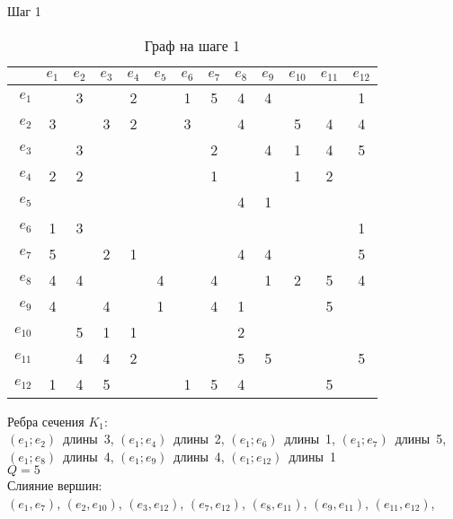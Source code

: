\bigskip
\noindent
\begin{minipage}{\textwidth}
Шаг 1\\
\begin{table}[H]
\centering
\caption{Граф на шаге 1}
\begin{tabular}{r*{12}{|c}}
&$e_{1}$&$e_{2}$&$e_{3}$&$e_{4}$&$e_{5}$&$e_{6}$&$e_{7}$&$e_{8}$&$e_{9}$&$e_{10}$&$e_{11}$&$e_{12}$\\
\hline $e_{1}$&&3&&2&&1&5&4&4&&&1\\
\hline $e_{2}$&3&&3&2&&3&&4&&5&4&4\\
\hline $e_{3}$&&3&&&&&2&&4&1&4&5\\
\hline $e_{4}$&2&2&&&&&1&&&1&2&\\
\hline $e_{5}$&&&&&&&&4&1&&&\\
\hline $e_{6}$&1&3&&&&&&&&&&1\\
\hline $e_{7}$&5&&2&1&&&&4&4&&&5\\
\hline $e_{8}$&4&4&&&4&&4&&1&2&5&4\\
\hline $e_{9}$&4&&4&&1&&4&1&&&5&\\
\hline $e_{10}$&&5&1&1&&&&2&&&&\\
\hline $e_{11}$&&4&4&2&&&&5&5&&&5\\
\hline $e_{12}$&1&4&5&&&1&5&4&&&5&\\
\end{tabular}
\end{table}
Ребра сечения $K_{1}$:\\
\mbox{$(e_{1};e_{2})$ длины 3},
\mbox{$(e_{1};e_{4})$ длины 2},
\mbox{$(e_{1};e_{6})$ длины 1},
\mbox{$(e_{1};e_{7})$ длины 5},
\mbox{$(e_{1};e_{8})$ длины 4},
\mbox{$(e_{1};e_{9})$ длины 4},
\mbox{$(e_{1};e_{12})$ длины 1}\\
$Q=5$\\
Слияние вершин:\\
\mbox{$(e_{1},e_{7})$},
\mbox{$(e_{2},e_{10})$},
\mbox{$(e_{3},e_{12})$},
\mbox{$(e_{7},e_{12})$},
\mbox{$(e_{8},e_{11})$},
\mbox{$(e_{9},e_{11})$},
\mbox{$(e_{11},e_{12})$},
\end{minipage}
\bigskip
\noindent
